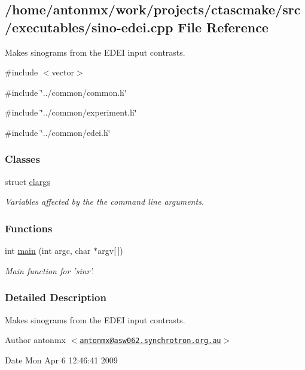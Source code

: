 \hypertarget{sino-edei_8cpp}{
\subsection{/home/antonmx/work/projects/ctascmake/src/executables/sino-\/edei.cpp File Reference}
\label{sino-edei_8cpp}
}


Makes sinograms from the EDEI input contrasts.  


{\ttfamily \#include $<$vector$>$}\par
{\ttfamily \#include \char`\"{}../common/common.h\char`\"{}}\par
{\ttfamily \#include \char`\"{}../common/experiment.h\char`\"{}}\par
{\ttfamily \#include \char`\"{}../common/edei.h\char`\"{}}\par
\subsubsection*{Classes}
\begin{DoxyCompactItemize}
\item 
struct \hyperlink{structclargs}{clargs}
\begin{DoxyCompactList}\small\item\em Variables affected by the the command line arguments. \item\end{DoxyCompactList}\end{DoxyCompactItemize}
\subsubsection*{Functions}
\begin{DoxyCompactItemize}
\item 
int \hyperlink{sino-edei_8cpp_a0ddf1224851353fc92bfbff6f499fa97}{main} (int argc, char $\ast$argv\mbox{[}$\,$\mbox{]})
\begin{DoxyCompactList}\small\item\em Main function for 'sinr'. \item\end{DoxyCompactList}\end{DoxyCompactItemize}


\subsubsection{Detailed Description}
Makes sinograms from the EDEI input contrasts. \begin{DoxyAuthor}{Author}
antonmx $<$\href{mailto:antonmx@asw062.synchrotron.org.au}{\tt antonmx@asw062.synchrotron.org.au}$>$ 
\end{DoxyAuthor}
\begin{DoxyDate}{Date}
Mon Apr 6 12:46:41 2009 
\end{DoxyDate}


